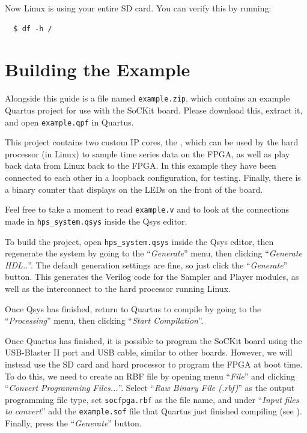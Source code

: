 \documentclass{sockitguide}
\begin{document}
Now Linux is using your entire SD card. You can verify this by running:
\begin{verbatim}
  $ df -h /
\end{verbatim}

\section{Building the Example}

Alongside this guide is a file named \texttt{example.zip}, which
contains an example Quartus project for use with the SoCKit
board. Please download this, extract it, and open \texttt{example.qpf}
in Quartus.

This project contains two custom IP cores, the , which can be used
by the hard processor (in Linux) to sample time series data on the
FPGA, as well as play back data from Linux back to the FPGA. In this
example they have been connected to each other in a loopback
configuration, for testing. Finally, there is a binary counter that
displays on the LEDs on the front of the board.

Feel free to take a moment to read \texttt{example.v} and to look at
the connections made in \texttt{hps\_system.qsys} inside the Qsys
editor.

To build the project, open \texttt{hps\_system.qsys} inside the Qsys
editor, then regenerate the system by going to the
``\textit{Generate}'' menu, then clicking ``\textit{Generate
  HDL..}''. The default generation settings are fine, so just click
the ``\textit{Generate}'' button. This generates the Verilog code for
the Sampler and Player modules, as well as the interconnect to the
hard processor running Linux.

Once Qsys has finished, return to Quartus to compile by going to the
``\textit{Processing}'' menu, then clicking ``\textit{Start
  Compilation}''.

Once Quartus has finished, it is possible to program the SoCKit board
using the USB-Blaster II port and USB cable, similar to other
boards. However, we will instead use the SD card and hard processor to
program the FPGA at boot time. To do this, we need to create an RBF
file by opening menu ``\textit{File}'' and clicking ``\textit{Convert
  Programming Files...}''. Select ``\textit{Raw Binary File (.rbf)}''
as the output programming file type, set \texttt{socfpga.rbf} as the
file name, and under ``\textit{Input files to convert}'' add the
\texttt{example.sof} file that Quartus just finished compiling (see
). Finally, press the ``\textit{Generate}'' button.
\end{document}
